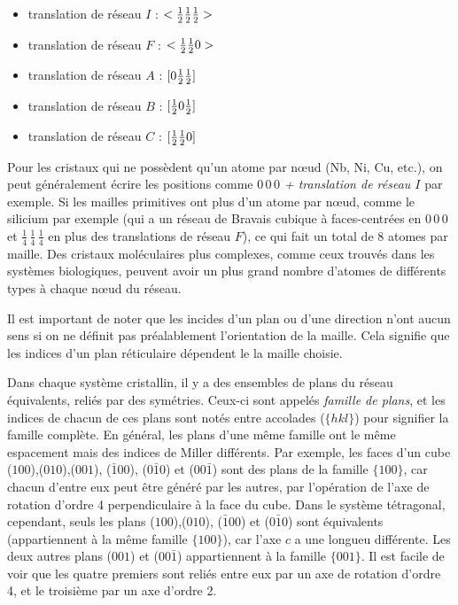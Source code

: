 \begin{itemize}
    \item translation de réseau $I$ : $<\mbox{$\frac{1}{2}$}\mbox{$\frac{1}{2}$}\mbox{$\frac{1}{2}$}>$
    \item translation de réseau $F$ : $<\mbox{$\frac{1}{2}$} \mbox{$\frac{1}{2}$} 0>$
    \item translation de réseau $A$ : $[0 \mbox{$\frac{1}{2}$} \mbox{$\frac{1}{2}$}]$
    \item translation de réseau $B$ : $[\mbox{$\frac{1}{2}$} 0 \mbox{$\frac{1}{2}$}]$
    \item translation de réseau $C$ : $[\mbox{$\frac{1}{2}$} \mbox{$\frac{1}{2}$} 0]$
\end{itemize}

Pour les cristaux qui ne possèdent qu'un atome par nœud (\ie Nb, Ni, Cu, etc.),
on peut généralement écrire les positions comme \emph{$0\,0\,0$ + translation de
réseau $I$} par exemple. Si les mailles primitives ont plus d'un atome par nœud,
comme le silicium par exemple (qui a un réseau de Bravais cubique à
faces-centrées en $0\,0\,0$ et $\frac{1}{4}\,\frac{1}{4}\,\frac{1}{4}$ en plus
des translations de réseau $F$), ce qui fait un total de 8 atomes par maille. Des
cristaux moléculaires plus complexes, comme ceux trouvés dans les systèmes
biologiques, peuvent avoir un plus grand nombre d'atomes de différents types à
chaque nœud du réseau.

Il est important de noter que les incides d'un plan ou d'une direction n'ont
aucun sens si on ne définit pas préalablement l'orientation de la maille. Cela
signifie que les indices d'un plan réticulaire dépendent le la maille choisie.

Dans chaque système cristallin, il y a des ensembles de plans du réseau
équivalents, reliés par des symétries. Ceux-ci sont appelés \emph{famille de
plans}, et les indices de chacun de ces plans sont notés entre accolades
($\{hkl\}$) pour signifier la famille complète. En général, les plans d'une même
famille ont le même espacement mais des indices de Miller différents. Par
exemple, les faces d'un cube ($100$),($010$),($001$), ($\bar{1}00$),
($0\bar{1}0$) et ($00\bar{1}$) sont des plans de la famille $\{100\}$, car chacun
d'entre eux peut être généré par les autres, par l'opération de l'axe de rotation
d'ordre 4 perpendiculaire à la face du cube. Dans le système tétragonal,
cependant, seuls les plans ($100$),($010$), ($\bar{1}00$) et ($0\bar{1}0$) sont
équivalents (appartiennent à la même famille $\{100\}$), car l'axe $c$ a une
longueu différente. Les deux autres plans ($001$) et ($00\bar{1}$) appartiennent
à la famille $\{001\}$. Il est facile de voir que les quatre premiers sont reliés
entre eux par un axe de rotation d'ordre 4, et le troisième par un axe d'ordre 2.

